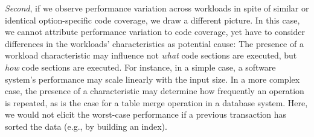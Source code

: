 {{\textit{Second}, if we observe performance variation across workloads in spite of similar or identical option-specific code coverage, we draw a different picture. In this case, we cannot attribute performance variation to code coverage, yet have to consider differences in the workloads’ characteristics as potential cause: The presence of a workload characteristic may influence not  \emph{what} code sections are executed, but \emph{how} code sections are executed. For instance, in a simple case, a software system’s performance may scale linearly with the input size. In a more complex case, the presence of a characteristic may determine how frequently an operation is repeated, as is the case for a table merge operation in a database system. Here, we would not elicit the worst-case performance if a previous transaction has sorted the data (e.g., by building an index).

}}
